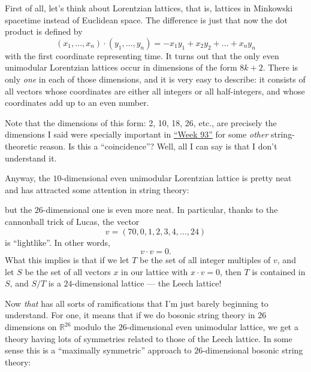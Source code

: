 \documentclass{article}
\def\tightlist{}
\renewcommand{\texttt}[1]{%
  \begingroup
  \ttfamily
  \begingroup\lccode`~=`/\lowercase{\endgroup\def~}{/\discretionary{}{}{}}%
  \begingroup\lccode`~=`[\lowercase{\endgroup\def~}{[\discretionary{}{}{}}%
  \begingroup\lccode`~=`.\lowercase{\endgroup\def~}{.\discretionary{}{}{}}%
  \catcode`/=\active\catcode`[=\active\catcode`.=\active
  \scantokens{#1\noexpand}%
  \endgroup
}
\begin{document}
First of all, let's think about Lorentzian lattices, that is, lattices
in Minkowski spacetime instead of Euclidean space. The difference is
just that now the dot product is defined by
\[(x_1,\ldots,x_n)\cdot(y_1,\ldots,y_n) = -x_1y_1+x_2 y_2+\ldots+x_ny_n\]
with the first coordinate representing time. It turns out that the only
even unimodular Lorentzian lattices occur in dimensions of the form
\(8k + 2\). There is only \emph{one} in each of those dimensions, and it
is very easy to describe: it consists of all vectors whose coordinates
are either all integers or all half-integers, and whose coordinates add
up to an even number.

Note that the dimensions of this form: 2, 10, 18, 26, etc., are
precisely the dimensions I said were specially important in
\protect\hyperlink{week93}{``Week 93''} for some \emph{other}
string-theoretic reason. Is this a ``coincidence''? Well, all I can say
is that I don't understand it.

Anyway, the \(10\)-dimensional even unimodular Lorentzian lattice is
pretty neat and has attracted some attention in string theory:


but the \(26\)-dimensional one is even more neat. In particular, thanks
to the cannonball trick of Lucas, the vector
\[v = (70,0,1,2,3,4,\ldots,24)\] is ``lightlike''. In other words,
\[v\cdot v=0.\] What this implies is that if we let \(T\) be the set of
all integer multiples of \(v\), and let \(S\) be the set of all vectors
\(x\) in our lattice with \(x\cdot v = 0\), then \(T\) is contained in
\(S\), and \(S/T\) is a \(24\)-dimensional lattice --- the Leech
lattice!

Now \emph{that} has all sorts of ramifications that I'm just barely
beginning to understand. For one, it means that if we do bosonic string
theory in 26 dimensions on \(\mathbb{R}^{26}\) modulo the
\(26\)-dimensional even unimodular lattice, we get a theory having lots
of symmetries related to those of the Leech lattice. In some sense this
is a ``maximally symmetric'' approach to \(26\)-dimensional bosonic
string theory:
\end{document}
